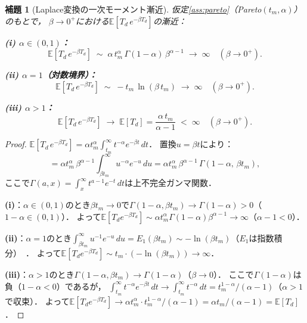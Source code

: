 \documentclass[12pt,a4paper]{article}
\theoremstyle{plain}
\newtheorem{lemma}[theorem]{補題}
\theoremstyle{definition}
\theoremstyle{remark}
\newcommand{\E}{\mathbb{E}}
\begin{document}
\begin{lemma}[Laplace変換の一次モーメント漸近]\label{lem:laplace_moment}
仮定\ref{ass:pareto}（Pareto$(t_m,\alpha)$）のもとで，
$\beta\to0^+$における$\E[T_d\,e^{-\beta T_d}]$の漸近：

\noindent\textbf{(i) $\alpha\in(0,1)$：}
\begin{equation}\label{eq:ET_asym_sub}
  \E[T_d\,e^{-\beta T_d}]
  \;\sim\;
  \alpha\,t_m^{\alpha}\,\Gamma(1-\alpha)\,\beta^{\alpha-1}
  \;\to\;\infty
  \quad(\beta\to0^+).
\end{equation}

\noindent\textbf{(ii) $\alpha=1$（対数境界）：}
\begin{equation}\label{eq:ET_asym_1}
  \E[T_d\,e^{-\beta T_d}]
  \;\sim\;
  -t_m\,\ln(\beta\,t_m)
  \;\to\;\infty
  \quad(\beta\to0^+).
\end{equation}

\noindent\textbf{(iii) $\alpha>1$：}
\begin{equation}\label{eq:ET_asym_lin}
  \E[T_d\,e^{-\beta T_d}]
  \;\to\;
  \E[T_d] = \frac{\alpha\,t_m}{\alpha-1}
  \;<\;\infty
  \quad(\beta\to0^+).
\end{equation}
\end{lemma}

\begin{proof}
$\E[T_d\,e^{-\beta T_d}]
=\alpha t_m^\alpha\int_{t_m}^\infty t^{-\alpha}e^{-\beta t}\,dt$．
置換$u=\beta t$により：
\begin{equation*}
  =\alpha t_m^\alpha\,\beta^{\alpha-1}\int_{\beta t_m}^\infty u^{-\alpha}e^{-u}\,du
  =\alpha t_m^\alpha\,\beta^{\alpha-1}\,\Gamma(1-\alpha,\,\beta t_m),
\end{equation*}
ここで$\Gamma(a,x)=\int_x^\infty t^{a-1}e^{-t}\,dt$は上不完全ガンマ関数．

\textbf{(i)}：$\alpha\in(0,1)$のとき$\beta t_m\to0$で$\Gamma(1-\alpha,\beta t_m)\to\Gamma(1-\alpha)>0$（$1-\alpha\in(0,1)$）．
よって$\E[T_d e^{-\beta T_d}]\sim\alpha t_m^\alpha\Gamma(1-\alpha)\beta^{\alpha-1}\to\infty$（$\alpha-1<0$）．

\textbf{(ii)}：$\alpha=1$のとき$\int_{\beta t_m}^\infty u^{-1}e^{-u}\,du=E_1(\beta t_m)\sim -\ln(\beta t_m)$（$E_1$は指数積分）~\cite{abramowitz1965}．
よって$\E[T_d e^{-\beta T_d}]\sim t_m\cdot(-\ln(\beta t_m))\to\infty$．

\textbf{(iii)}：$\alpha>1$のとき$\Gamma(1-\alpha,\beta t_m)\to\Gamma(1-\alpha)$（$\beta\to0$）．
ここで$\Gamma(1-\alpha)$は負（$1-\alpha<0$）であるが，
$\int_{t_m}^\infty t^{-\alpha}e^{-\beta t}\,dt\to\int_{t_m}^\infty t^{-\alpha}\,dt=t_m^{1-\alpha}/(\alpha-1)$（$\alpha>1$で収束）．
よって$\E[T_d e^{-\beta T_d}]\to\alpha t_m^\alpha\cdot t_m^{1-\alpha}/(\alpha-1)=\alpha t_m/(\alpha-1)=\E[T_d]$．
\end{proof}
\end{document}
